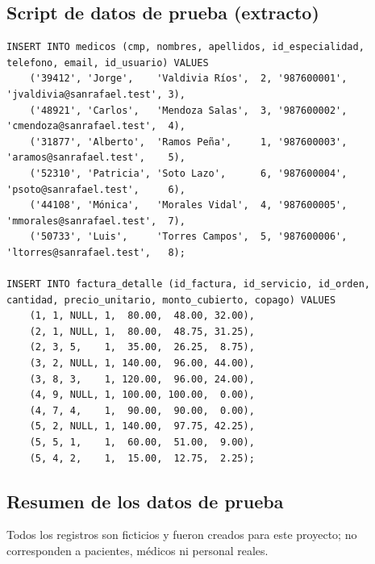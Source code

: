 \documentclass[11pt,a4paper]{article}
\begin{document}
\subsection{Script de datos de prueba (extracto)}

\begin{lstlisting}[style=sql, caption={Médicos y detalle de comprobantes (extracto de \texttt{02-datos-prueba.sql})}, label={lst:inserts}]
INSERT INTO medicos (cmp, nombres, apellidos, id_especialidad, telefono, email, id_usuario) VALUES
    ('39412', 'Jorge',    'Valdivia Ríos',  2, '987600001', 'jvaldivia@sanrafael.test', 3),
    ('48921', 'Carlos',   'Mendoza Salas',  3, '987600002', 'cmendoza@sanrafael.test',  4),
    ('31877', 'Alberto',  'Ramos Peña',     1, '987600003', 'aramos@sanrafael.test',    5),
    ('52310', 'Patricia', 'Soto Lazo',      6, '987600004', 'psoto@sanrafael.test',     6),
    ('44108', 'Mónica',   'Morales Vidal',  4, '987600005', 'mmorales@sanrafael.test',  7),
    ('50733', 'Luis',     'Torres Campos',  5, '987600006', 'ltorres@sanrafael.test',   8);

INSERT INTO factura_detalle (id_factura, id_servicio, id_orden, cantidad, precio_unitario, monto_cubierto, copago) VALUES
    (1, 1, NULL, 1,  80.00,  48.00, 32.00),
    (2, 1, NULL, 1,  80.00,  48.75, 31.25),
    (2, 3, 5,    1,  35.00,  26.25,  8.75),
    (3, 2, NULL, 1, 140.00,  96.00, 44.00),
    (3, 8, 3,    1, 120.00,  96.00, 24.00),
    (4, 9, NULL, 1, 100.00, 100.00,  0.00),
    (4, 7, 4,    1,  90.00,  90.00,  0.00),
    (5, 2, NULL, 1, 140.00,  97.75, 42.25),
    (5, 5, 1,    1,  60.00,  51.00,  9.00),
    (5, 4, 2,    1,  15.00,  12.75,  2.25);
\end{lstlisting}

\subsection{Resumen de los datos de prueba}

Todos los registros son ficticios y fueron creados para este proyecto; no corresponden a
pacientes, médicos ni personal reales.
\end{document}
